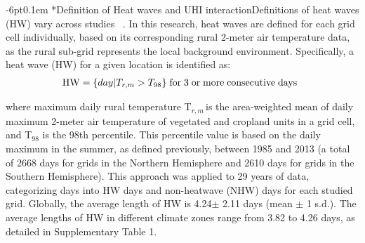 \documentclass[]{nature}
\makeatletter
\def\style#1#2{#2}
\renewcommand{\subsection}{\@startsection {subsection}{2}{0pt}%
    {-6pt}{0.1em}%
    {\fontsize{12pt}{14pt}\selectfont\sffamily\bfseries}%
    }
\makeatother
\begin{document}
\subsection*{Definition of Heat waves and UHI interaction}Definitions of heat waves (HW) vary across studies\unskip~\cite{2755510:33598930,2755510:33598927} . In this research, heat waves are defined for each grid cell individually, based on its corresponding rural 2-meter air temperature data, as the rural sub-grid represents the local background environment. Specifically, a heat wave (HW) for a given location is identified as:
\let\saveeqnno\theequation
\let\savefrac\frac
\def\dispfrac{\displaystyle\savefrac}
\begin{eqnarray}
\let\frac\dispfrac
\gdef\theequation{1}
\let\theHequation\theequation
\label{dfg-2755510:33598937}
\begin{array}{@{}l}\style{font-family:'Times New Roman'}{\mathrm{HW}=\{day\vert T_{r,m}>T_{98}\}\;\mathrm{for}\;3\;\mathrm{or}\;\mathrm{more}\;\mathrm{consecutive}\;\mathrm{days}}\end{array}
\end{eqnarray}
\global\let\theequation\saveeqnno
\addtocounter{equation}{-1}\ignorespaces 
where maximum daily rural temperature  T\ensuremath{_{r,m\ }}is the area-weighted mean of daily maximum 2-meter air temperature of vegetated and cropland units in a grid cell, and T\ensuremath{_{98}} is the 98th percentile. This percentile value is based on the daily maximum in the summer, as defined previously, between 1985 and 2013 (a total of 2668 days for grids in the Northern Hemisphere and 2610 days for grids in the Southern Hemisphere). This approach was applied to 29 years of data, categorizing days into HW days and non-heatwave (NHW) days for each studied grid. Globally, the average length of HW is 4.24\ensuremath{\pm} 2.11 days (mean \ensuremath{\pm} 1 s.d.). The average lengths of HW in different climate zones range from 3.82 to 4.26 days, as detailed in Supplementary Table 1. 
\end{document}

